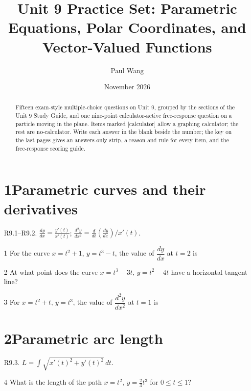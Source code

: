 \documentclass{apcalc}
\title{Unit 9 Practice Set: Parametric Equations, Polar Coordinates, and Vector-Valued Functions}
\author{Paul Wang}
\date{November 2026}
\begin{document}
\maketitle
\begin{abstract}
Fifteen exam-style multiple-choice questions on Unit 9, grouped by the sections of the Unit 9 Study Guide, and one nine-point calculator-active free-response question on a particle moving in the plane. Items marked [calculator] allow a graphing calculator; the rest are no-calculator. Write each answer in the blank beside the number; the key on the last pages gives an answers-only strip, a reason and rule for every item, and the free-response scoring guide.
\end{abstract}
\section*{1\quad Parametric curves and their derivatives}
\begin{setrule}R9.1–R9.2. $\frac{dy}{dx}=\frac{y'(t)}{x'(t)}$; $\frac{d^2y}{dx^2}=\frac{d}{dt}\!\left(\frac{dy}{dx}\right)\big/x'(t)$.\end{setrule}
\begin{q}{1}
For the curve $x=t^2+1$, $y=t^3-t$, the value of $\dfrac{dy}{dx}$ at $t=2$ is
\end{q}
\begin{q}{2}
At what point does the curve $x=t^3-3t$, $y=t^2-4t$ have a horizontal tangent line?
\end{q}
\begin{q}{3}
For $x=t^2+t$, $y=t^3$, the value of $\dfrac{d^2y}{dx^2}$ at $t=1$ is
\end{q}
\section*{2\quad Parametric arc length}
\begin{setrule}R9.3. $L=\int\sqrt{x'(t)^2+y'(t)^2}\,dt$.\end{setrule}
\begin{q}{4}
What is the length of the path $x=t^2$, $y=\frac23t^3$ for $0\le t\le1$?
\end{q}
\end{document}
